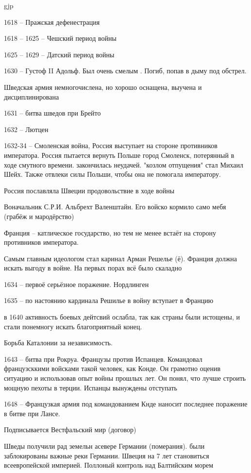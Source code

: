gjp	 \documentclass[12pt,a4paper]{article}
\begin{document}
1618 -- Пражская дефенестрация 

1618 -- 1625 -- Чешский период войны

1625 -- 1629 -- Датский период войны

1630 --  Густоф II Адольф. Был очень смелым . Погиб, попав в дыму под обстрел.



Шведская армия немногочислена, но хорошо оснащена, выучена и дисциплинирована

1631 -- битва шведов при Брейто

1632 -- Лютцен

1632-34 -- Смоленская война, Россия выступает на стороне противников императора. Россия пытается вернуть Польше город Смоленск, потерянный в ходе смутного времени. закончилась неудачей. "козлом отпущения" стал Михаил Шейх. Также отвлеки силы Польши, чтобы она не помогала императору.

Россия пославляла Швеции продовольствие в ходе войны

Воначальник С.Р.И. Альбрехт Валенштайн. Его войско кормило само мебя (грабёж и мародёрство)

Франция -- катлическое государство, но тем не менее встаёт на сторону противников императора.

Самым главным идеологом стал каринал Арман Решелье (ё). Франция должна искать выгоду в войне. На первых порах всё было скаладно

1634 -- первоё серьёзное поражение. Нордлинген

1635 -- по настоянию кардинала Решилье в войну вступает в Францию

в 1640 активность боевых дейтсвий ослабла, так как страны были истощены, и стали понемногу искать благоприятный конец.

Борьба Каталонии за независимость.

1643 -- битва при Рокруа. Французы против Испанцев. Командовал французсккими войсками такой человек, как Конде. Он грамотно оценив ситуацию и использовав опыт войны прошлых лет. Он понял, что лучше строить мощную пехоты в терции. Испанцы вынуждены отступать

1648 -- Французкая армия под командованием Кнде наносит последнее поражение в битве при Лансе.

Подписывается Вестфальский мир (договор) 

Шведы получили рад земельн асевере Германии (померания). были заблокированы важные реки Германии. Швеция на 7 лет становиться всеевропейской империей. Поллоный контроль над Балтийским морем
\end{document}
